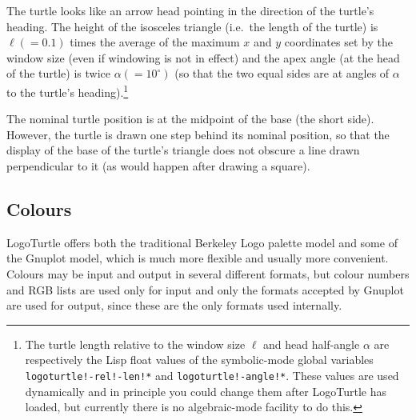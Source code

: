 The turtle looks like an arrow head pointing in the direction of the
turtle's heading.  The height of the isosceles triangle (i.e.\ the
length of the turtle) is $\ell (= 0.1)$ times the average of the
maximum $x$ and $y$ coordinates set by the window size (even if
windowing is not in effect) and the apex angle (at the head of the
turtle) is twice $\alpha (= 10^{\circ})$ (so that the two equal sides
are at angles of $\alpha$ to the turtle's heading).\footnote{The
turtle length relative to the window size $\ell$ and head half-angle
$\alpha$ are respectively the Lisp float values of the symbolic-mode
global variables \texttt{logoturtle!-rel!-len!*} and
\texttt{logoturtle!-angle!*}.  These values are used dynamically and
in principle you could change them after LogoTurtle has loaded, but
currently there is no algebraic-mode facility to do this.}

The nominal turtle position is at the midpoint of the base (the short
side).  However, the turtle is drawn one step behind its nominal
position, so that the display of the base of the turtle's triangle
does not obscure a line drawn perpendicular to it (as would happen
after drawing a square).


\subsection{Colours}
\label{logoturtle:Colours}

LogoTurtle offers both the traditional Berkeley Logo palette model and
some of the Gnuplot model, which is much more flexible and usually
more convenient.  Colours may be input and output in several different
formats, but colour numbers and RGB lists are used only for input and
only the formats accepted by Gnuplot are used for output, since these
are the only formats used internally.

